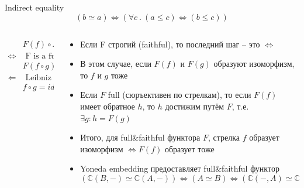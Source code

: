 \documentclass[
  russian,
  aspectratio=169,
  xcolor={svgnames},
  hyperref={colorlinks,citecolor=DeepPink4}]{beamer}
\begin{document}
\begin{frame}[fragile]{Indirect equality}
$$
(b \simeq a) \Leftrightarrow (\forall c\ .\ (a \leqslant c) \Leftrightarrow (b \leqslant c))
$$\vspace{0.5cm}

\begin{minipage}[0.2\textheight]{\textwidth}
\begin{columns}[T]
\begin{column}{0.2\textwidth}
\begin{align*}
                & F(f) \circ F(g) = id \\
\Leftrightarrow & \text { F is a functor } \\
                & F(f \circ g) = F(id) \\
\Leftarrow      & \text { Leibniz } \\
                & f \circ g= id
\end{align*}
\end{column}
\begin{column}{0.8\textwidth}
\begin{itemize}%
\item Если F строгий (faithful), то последний шаг -- это
$\Leftrightarrow$
\item В этом случае, если $F(f)$ и $F(g)$ образуют изоморфизм, то $f$ и $g$ тоже
\item Если $F$ full (сюръективен по стрелкам), то если $F(f)$ имеет обратное $h$, то $h$ достижим путём $F$, т.е. $\exists g : h=F(g)$
\item Итого, для full\&faithful функтора $F$, стрелка $f$ образует изоморфизм $\Leftrightarrow F(f)$ образует тоже
\item Yoneda embedding предоставляет full\&faithful функтор
$$
(\mathbb{C}(B,-) \simeq \mathbb{C}(A,-)) \Leftrightarrow
(A\simeq B) \Leftrightarrow
(\mathbb{C}(-,A) \simeq \mathbb{C}(-,B))
$$

\end{itemize}
\end{column}
\end{columns}
\end{minipage}
\end{frame}
\end{document}
